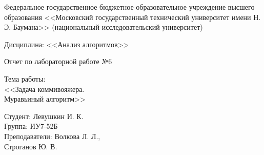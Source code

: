 \documentclass[a4paper,12pt]{article}
\begin{document}

\large
\begin{center}
	Федеральное государственное бюджетное образовательное учреждение 
	высшего образования <<Московский государственный технический 
	университет имени Н. Э. Баумана>> 
	(национальный исследовательский университет)
\end{center}

\vspace*{30mm} 

\huge
\begin{center}
	Дисциплина: <<Анализ алгоритмов>>
	
	Отчет по лабораторной работе №6
\end{center}

\vspace*{30mm} 

\huge
\begin{center}
	Тема работы:\\
	<<Задача коммивояжера.\\ Муравьиный алгоритм>>
\end{center}
\vspace*{30mm} 

\large
\begin{flushright}
	Студент: Левушкин И. К. \\
	Группа: ИУ7-52Б \\
	Преподаватели: Волкова Л. Л., \\ Строганов Ю. В. \\
\end{flushright}
\end{document}
